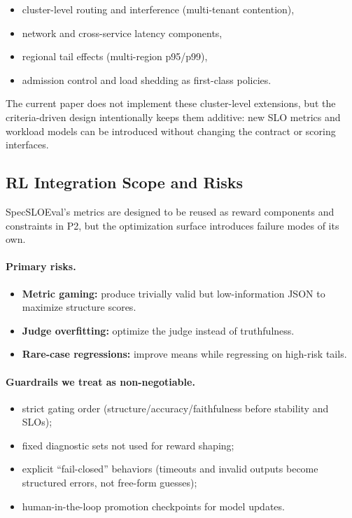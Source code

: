 \documentclass[11pt]{article}
\begin{document}
\begin{itemize}[leftmargin=12pt]
    \item cluster-level routing and interference (multi-tenant contention),
    \item network and cross-service latency components,
    \item regional tail effects (multi-region p95/p99),
    \item admission control and load shedding as first-class policies.
\end{itemize}

The current paper does not implement these cluster-level extensions, but the criteria-driven design intentionally keeps them additive: new SLO metrics and workload models can be introduced without changing the contract or scoring interfaces.

\subsection{RL Integration Scope and Risks}

SpecSLOEval's metrics are designed to be reused as reward components and constraints in P2, but the optimization surface introduces failure modes of its own.

\paragraph{Primary risks.}
\begin{itemize}[leftmargin=12pt]
    \item \textbf{Metric gaming:} produce trivially valid but low-information JSON to maximize structure scores.
    \item \textbf{Judge overfitting:} optimize the judge instead of truthfulness.
    \item \textbf{Rare-case regressions:} improve means while regressing on high-risk tails.
\end{itemize}

\paragraph{Guardrails we treat as non-negotiable.}
\begin{itemize}[leftmargin=12pt]
    \item strict gating order (structure/accuracy/faithfulness before stability and SLOs);
    \item fixed diagnostic sets not used for reward shaping;
    \item explicit ``fail-closed'' behaviors (timeouts and invalid outputs become structured errors, not free-form guesses);
    \item human-in-the-loop promotion checkpoints for model updates.
\end{itemize}
\end{document}
